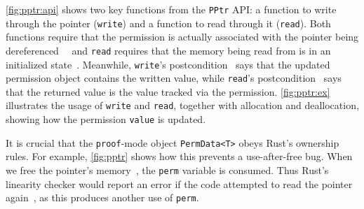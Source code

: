 \autoref{fig:pptr:api} shows two key functions from the \verb`PPtr` API: a function to write
through the pointer (\verb`write`) and a function to read through it (\verb`read`).
Both functions require that the permission is actually associated with the 
pointer being dereferenced~~
and \verb`read` requires that the memory being read from
is in an initialized state~.
Meanwhile, \verb`write`'s postcondition~ says that the updated permission object
contains the written value, while \verb`read`'s postcondition~ says that the returned value
is the value tracked via the permission.
\autoref{fig:pptr:ex} illustrates the usage of \verb`write` and \verb`read`,
together with allocation and deallocation, showing how the permission \verb`value` is updated.

It is crucial that the \verb`proof`-mode object \verb`PermData<T>` 
obeys Rust's ownership rules.
For example, \autoref{fig:pptr} shows how this prevents a use-after-free bug.
When we free the pointer's memory~,
the \verb`perm` variable is consumed. Thus Rust's linearity checker would report an error 
if the code attempted to read the pointer
again~, as this produces another use
of \verb`perm`. 


